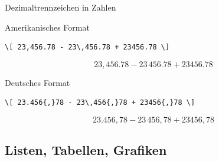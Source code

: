 \begin{Frame}[fragile]{Dezimaltrennzeichen in Zahlen}
  \begin{Block}{Amerikanisches Format}
    \begin{lstlisting}[gobble=6,style=block]
      \[ 23,456.78 - 23\,456.78 + 23456.78 \]
    \end{lstlisting}
    \[ 23,456.78 - 23\,456.78 + 23456.78 \]
  \end{Block}

  \xxx

  \begin{Block}{Deutsches Format}
    \begin{lstlisting}[gobble=6,style=block]
      \[ 23.456{,}78 - 23\,456{,}78 + 23456{,}78 \]
    \end{lstlisting}
    \[ 23.456{,}78 - 23\,456{,}78 + 23456{,}78 \]
  \end{Block}
\end{Frame}

\subsection{Listen, Tabellen, Grafiken}

